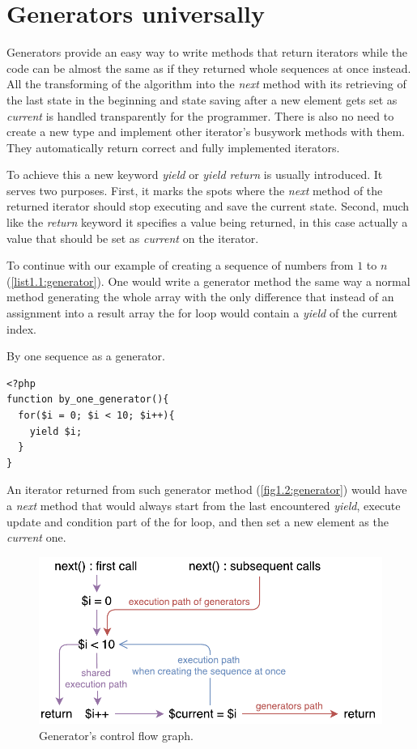 \section{Generators universally}

Generators provide an easy way to write methods that return iterators while the code can be almost the same as if they returned whole sequences at once instead. All the transforming of the algorithm into the \emph{next} method with its retrieving of the last state in the beginning and state saving after a new element gets set as \emph{current} is handled transparently for the programmer. There is also no need to create a new type and implement other iterator’s busywork methods with them. They automatically return correct and fully implemented iterators.

To achieve this a new keyword \emph{yield} or \emph{yield return} is usually introduced. It serves two purposes. First, it marks the spots where the \emph{next} method of the returned iterator should stop executing and save the current state. Second, much like the \emph{return} keyword it specifies a value being returned, in this case actually a value that should be set as \emph{current} on the iterator.

To continue with our example of creating a sequence of numbers from $1$ to $n$ (\autoref{list1.1:generator}). One would write a generator method the same way a normal method generating the whole array with the only difference that instead of an assignment into a result array the for loop would contain a \emph{yield} of the current index. 

\begin{listing}[H]
	\caption{By one sequence as a generator.}
	\label{list1.1:generator}
\begin{verbatim}
<?php
function by_one_generator(){
  for($i = 0; $i < 10; $i++){
    yield $i;
  }
}
\end{verbatim}
\end{listing}

An iterator returned from such generator method (\autoref{fig1.2:generator}) would have a \emph{next} method that would always start from the last encountered \emph{yield}, execute update and condition part of the for loop, and then set a new element as the \emph{current} one.

\begin{figure}[h]
	\centering	
	\includegraphics[scale=0.75]{../img/1_2_generators}	
	\caption{Generator's control flow graph.}
	\label{fig1.2:generator}
\end{figure}

